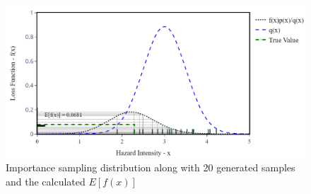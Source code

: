     \begin{figure}[H]
        \centering
        \includegraphics[scale=0.5]{Figures/Images/Illustrative Example/IS_samples.png}
        \caption{Importance sampling distribution along with 20 generated samples and the calculated $E[f(x)]$}
        \label{fig:IS_samples}
    \end{figure}